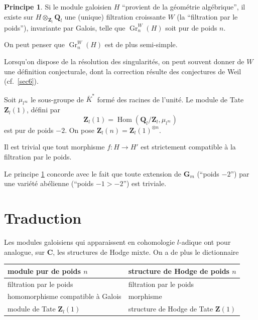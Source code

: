 \documentclass[12pt]{amsart}
\theoremstyle{definition}
\newtheorem{principe}{Principe}[section]
\DeclareMathOperator{\Gr}{Gr}
\DeclareMathOperator{\Hom}{Hom}
\newcommand{\Q}{\mathbf{Q}}
\newcommand{\Z}{\mathbf{Z}}
\newcommand{\C}{\mathbf{C}}
\begin{document}
\begin{principe}\label{princ2.1}
Si le module galoisien $H$ ``provient de la géométrie algébrique'', il existe sur $H \otimes_{\Z_{l}} \Q_{l}$ une (unique) filtration croissante $W$ (la ``filtration par le poids''), invariante par Galois, telle que $\Gr_{n}^{W}(H)$ soit pur de poids $n$.

On peut penser que $\Gr_{n}^{W}(H)$ est de plus semi-simple.
\end{principe}

Lorsqu'on dispose de la résolution des singularités, on peut souvent donner de $W$ une définition conjecturale, dont la correction résulte des conjectures de Weil \cite{Weil} (cf.\ \ref{sec6}).

Soit $\mu_{l^{\infty}}$ le sous-groupe de $\overline{K}^{*}$ formé des racines de l'unité. Le module de Tate $\Z_{l}(1)$, défini par
\[
\Z_{l}(1) = \Hom(\Q_{l}/\Z_{l}, \mu_{l^{\infty}})
\]
est pur de poids $-2$. On pose $\Z_{l}(n) = \Z_{l}(1)^{\otimes n}$.

Il est trivial que tout morphisme $f : H \to H'$ est strictement compatible à la filtration par le poids.

Le principe \ref{princ2.1} concorde avec le fait que toute extension de $\mathbf{G}_{m}$ (``poids $-2$'') par une variété abélienne (``poids $-1 > -2$'') est triviale.

\section{Traduction}\label{sec3}

Les modules galoisiens qui apparaissent en cohomologie $l$-adique ont pour analogue, sur $\C$, les structures de Hodge mixte. On a de plus le dictionnaire

\begin{center}
\begin{tabular}{|l|l|}
\hline
module pur de poids $n$ & structure de Hodge de poids $n$ \\
\hline
filtration par le poids & filtration par le poids \\
\hline
homomorphisme compatible à Galois & morphisme \\
\hline
module de Tate $\Z_{l}(1)$ & structure de Hodge de Tate $\Z(1)$ \\
\hline
\end{tabular}
\end{center}

\section{}\label{sec4}
\end{document}
